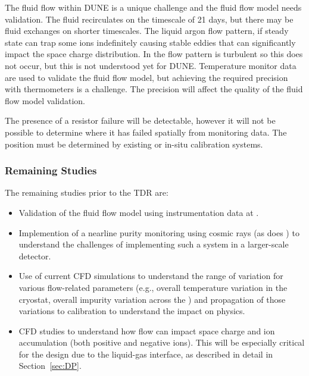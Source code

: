 The fluid flow within DUNE is a unique challenge and the fluid flow model needs validation. The fluid recirculates on the timescale of 21 days, but 
there may be fluid exchanges %
on shorter timescales. The liquid argon flow pattern, if steady state can trap some ions indefinitely causing stable eddies that can significantly impact the space charge distribution. 
In \microboone the flow pattern is turbulent so this does not occur, but this is not understood yet for DUNE.
Temperature monitor data are used to validate the fluid flow model, but achieving the %
required precision with thermometers is a challenge. %
The precision will %
affect the quality of the fluid flow model validation.

The presence of a  resistor failure will be detectable, however it will not be possible to determine where it has failed spatially from monitoring data. The position must be determined by existing or in-situ calibration systems. 


\subsubsection{Remaining Studies}
The remaining studies %
prior to the  TDR are: %
\begin{itemize}
\item Validation of the fluid flow model using instrumentation data at . %
\item Implemention of a nearline purity monitoring using cosmic rays (as does \microboone) to understand the challenges of implementing such a system in a larger-scale detector.
\item Use of current CFD simulations to understand the range of variation for various flow-related parameters (e.g., overall temperature variation in the cryostat, overall impurity variation across the \detmodule) and propagation of those variations to calibration %
to understand the impact on physics.
\item CFD studies to understand how \lar flow can impact space charge and ion accumulation (both positive and negative ions). This will be especially critical for the  design due to the liquid-gas interface, as described in detail in Section~\ref{sec:DP}.
\end{itemize}
